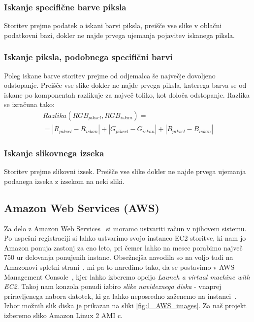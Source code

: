 \subsubsection{Iskanje specifične barve piksla}

Storitev prejme podatek o iskani barvi piksla, preišče vse slike v oblačni podatkovni bazi, dokler ne najde prvega ujemanja pojavitev iskanega piksla.

\subsubsection{Iskanje piksla, podobnega specifični barvi}

Poleg iskane barve storitev prejme od odjemalca še največje dovoljeno odstopanje.
Preišče vse slike dokler ne najde prvega piksla, katerega barva se od iskane po komponentah razlikuje za največ toliko, kot določa odstopanje.
Razlika se izračuna tako:
\begin{multline}
Razlika(RGB_{piksel}, RGB_{iskan}) = \\ = |R_{piksel} - R_{iskan}| + |G_{piksel} - G_{iskan}| + |B_{piksel} - B_{iskan}|
\end{multline}

\subsubsection{Iskanje slikovnega izseka}

Storitev prejme slikovni izsek.
Preišče vse slike dokler ne najde prvega ujemanja podanega izseka z izsekom na neki sliki.

\subsection{Amazon Web Services (AWS)}

Za delo z Amazon Web Services~\cite{1_aws_amazon} si moramo ustvariti račun v njihovem sistemu. Po uspešni registraciji si lahko ustvarimo svojo instanco EC2 storitve, ki nam jo Amazon ponuja zastonj za eno leto, pri čemer lahko na mesec porabimo največ 750 ur delovanja ponujenih instanc. Obsežnejša navodila so na voljo tudi na Amazonovi spletni strani~\cite{1_aws_amazon_tutorial}, mi pa to naredimo tako, da se postavimo v AWS Management Console~\cite{1_aws_amazon_console}, kjer lahko izberemo opcijo \emph{Launch a virtual machine with EC2}. Takoj nam konzola ponudi izbiro \emph{slike navideznega diska} - vnaprej priravljenega nabora datotek, ki ga lahko neposredno zaženemo na instanci~\cite{1_aws_amazon_ami}. Izbor možnih slik diska je prikazan na sliki \ref{fig:1_AWS_images}. Za naš projekt izberemo sliko Amazon Linux 2 AMI c.

